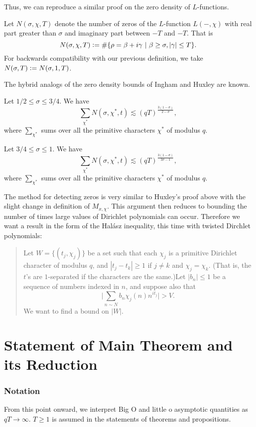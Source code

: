 Thus, we can reproduce a similar proof on the zero density of $L$-functions. 
\begin{definition}
    Let $N(\sigma,\chi,T)$ denote the number of zeros of the $L$-function $L(-,\chi)$ with real part greater than $\sigma$ and imaginary part between $-T$ and $-T$. That is \[
    N(\sigma,\chi,T) \mathrel{\mathop:}= \#\{\rho=\beta+i\gamma \ | \ \beta\geq \sigma, |\gamma|\leq T\}.
    \]
    For backwards compatibility with our previous definition, we take $N(\sigma,T)\mathrel{\mathop:}= N(\sigma, 1,T)$.
\end{definition}
The hybrid analogs of the zero density bounds of Ingham and Huxley are known.
\begin{theorem}
    Let $1/2\leq \sigma\leq 3/4$. We have \[
        \sum_{\chi^* }N(\sigma,\chi^*,t)\lesssim (qT)^{\frac{3(1-\sigma)}{2-\sigma}},
        \]
        where $\sum_{\chi^*}$ sums over all the primitive characters $\chi^*$ of modulus $q$.
\end{theorem}
\begin{theorem}
    Let $3/4\leq \sigma\leq 1$. We have \[
        \sum_{\chi^* }N(\sigma,\chi^*,t)\lesssim (qT)^{\frac{3(1-\sigma)}{3\sigma-1}},
        \]        
        where $\sum_{\chi^*}$ sums over all the primitive characters $\chi^*$ of modulus $q$.
\end{theorem}

The method for detecting zeros is very similar to Huxley's proof above with the slight change in definition of $M_{x,\chi}$. This argument then reduces to bounding the number of times large values of Dirichlet polynomials can occur. Therefore we want a result in the form of the Hal\'asz inequality, this time with twisted Dirchlet polynomials:
\begin{quotation}  
Let $W=\{(t_j,\chi_j)\}$ be a set such that each $\chi_j$ is a primitive Dirichlet character of modulus $q$, and $|t_j-t_k|\geq 1$ if $j\neq k$ and $\chi_j=\chi_k$. (That is, the $t$'s are $1$-separated if the characters are the same.)Let $|b_n|\leq 1$ be a sequence of numbers indexed in $n$, and suppose also that \[
\Bigg|\sum_{n\sim N} b_n\chi_j(n)n^{it_j} \Bigg|>V.
\]
We want to find a bound on $|W|$.
\end{quotation}
\section{Statement of Main Theorem and its Reduction}
\subsubsection*{Notation}
From this point onward, we interpret Big O and little o asymptotic quantities as $qT\to \infty$. $T\geq 1$ is assumed in the statements of theorems and propositions.

